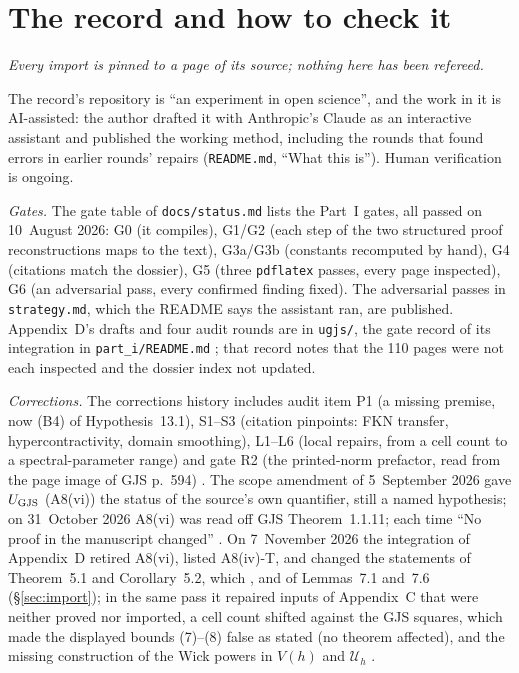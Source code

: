 \section{The record and how to check it}\label{sec:record}

\emph{Every import is pinned to a page of its source; nothing here has been refereed.}

The record's repository is ``an experiment in open science'', and the work in it is
AI-assisted: the author drafted it with Anthropic's Claude as an interactive assistant
and published the working method, including the rounds that found errors in earlier
rounds' repairs (\texttt{README.md}, ``What this is''). Human verification is ongoing.

\emph{Gates.} The gate table of \texttt{docs/status.md} lists the Part~I gates, all
passed on 10~August 2026: G0 (it compiles), G1/G2 (each step of the two structured proof
reconstructions maps to the text), G3a/G3b (constants recomputed by hand), G4 (citations
match the dossier), G5 (three \texttt{pdflatex} passes, every page inspected), G6 (an
adversarial pass, every confirmed finding fixed). The adversarial passes in \texttt{strategy.md}, which the README says the assistant ran,
are published. Appendix~D's drafts and four audit rounds are in \texttt{ugjs/}, the gate
record of its integration in \texttt{part\_i/README.md} ; that
record notes that the 110 pages were not each inspected and the dossier index not updated.

\emph{Corrections.} The corrections history includes audit item P1 (a missing premise,
now (B4) of Hypothesis~13.1), S1--S3 (citation pinpoints: FKN transfer,
hypercontractivity, domain smoothing), L1--L6 (local repairs, from a cell count to a
spectral-parameter range) and gate R2 (the printed-norm prefactor, read from the page
image of GJS p.~594) . The scope amendment of 5~September 2026 gave
$U_{\mathrm{GJS}}$ (A8(vi)) the status of the source's own quantifier, still a named hypothesis; on
31~October 2026 A8(vi) was read off GJS Theorem~1.1.11; each time ``No proof in the
manuscript changed'' . On 7~November 2026 the integration of
Appendix~D retired A8(vi), listed A8(iv)-T, and changed the statements of Theorem~5.1 and
Corollary~5.2, which , and of Lemmas~7.1 and~7.6 (\S\ref{sec:import}); in the same pass it repaired
inputs of Appendix~C that were neither proved nor imported, a cell count shifted against
the GJS squares, which made the displayed bounds (7)--(8) false as stated (no theorem
affected), and the missing construction of the Wick powers in
$V(h)$ and $\mathcal U_h$ .

